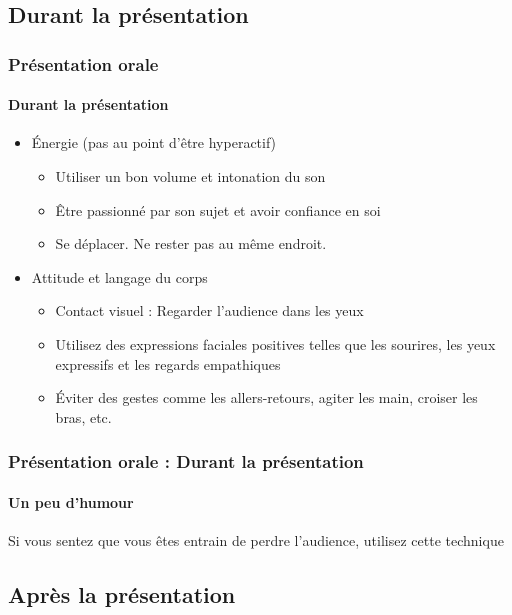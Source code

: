 \documentclass[xcolor=table, usenames,dvipsnames]{beamer}
\begin{document}
\subsection{Durant la présentation}

\begin{frame}
\frametitle{Présentation orale}
\framesubtitle{Durant la présentation}

\begin{itemize}
	\item Énergie (pas au point d'être hyperactif)
	\begin{itemize}
		\item Utiliser un bon volume et intonation du son 
		\item Être passionné par son sujet et avoir confiance en soi
		\item Se déplacer. Ne rester pas au même endroit.
	\end{itemize}
	\item Attitude et langage du corps
	\begin{itemize}
		\item Contact visuel : Regarder l'audience dans les yeux
		\item Utilisez des expressions faciales positives telles que les sourires, les yeux expressifs et les regards empathiques
		\item Éviter des gestes comme les allers-retours, agiter les main, croiser les bras, etc. 
	\end{itemize}
\end{itemize}

\end{frame}

\begin{frame}
\frametitle{Présentation orale : Durant la présentation}
\framesubtitle{Un peu d'humour}

\begin{center}
	Si vous sentez que vous êtes entrain de perdre l'audience, utilisez cette technique

\end{center}


\end{frame}

\subsection{Après la présentation}
\end{document}
